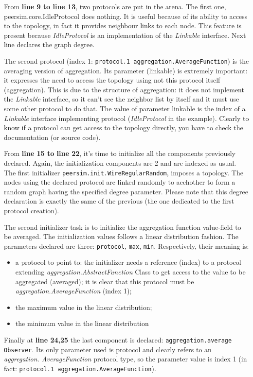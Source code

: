 \documentclass[a4paper,11pt]{article}
\begin{document}
From \textbf{line 9 to line 13}, two protocols are put in the arena.
The first one, peersim.core.IdleProtocol does nothing. It is useful
because of its ability to access to the topology, in fact it provides
neighbour links to each node. This feature is present because \emph{IdleProtocol}
is an implementation of the \emph{Linkable} interface. Next line declares
the graph degree. 

The second protocol (index 1: \texttt{protocol.1 aggregation.AverageFunction})
is the averaging version of aggregation. Its parameter (linkable)
is extremely important: it expresses the need to access the topology
using not this protocol itself (aggregation). This is due to the structure
of aggregation: it does not implement the \emph{Linkable} interface,
so it can't see the neighbor list by itself and it must use some other
protocol to do that. The value of parameter linkable is the index
of a \emph{Linkable} interface implementing protocol (\emph{IdleProtocol}
in the example). Clearly to know if a protocol can get access to the
topology directly, you have to check the documentation (or source
code).

From \textbf{line 15 to line 22}, it's time to initialize all the
components previously declared. Again, the initialization components
are 2 and are indexed as usual. The first initializer 
\texttt{peersim.init.WireRegularRandom},
imposes a topology. The nodes using the declared protocol are linked
randomly to aechother to form a random graph having the specified
degree parameter. Please note that this degree declaration is exactly
the same of the previous (the one dedicated to the first protocol
creation). 

The second initializer task is to initialize the aggregation function
value-field to be averaged. The initialization values follows a linear
distribution fashion. The parameters declared are three: \texttt{protocol},
\texttt{max}, \texttt{min}. Respectively, their meaning is:

\begin{itemize}
\item a protocol to point to: the initializer needs a reference (index)
to a protocol extending \emph{aggregation.AbstractFunction} Class
to get access to the value to be aggregated (averaged); it is clear
that this protocol must be \emph{aggregation.AverageFunction} (index
1);
\item the maximum value in the linear distribution; 
\item the minimum value in the linear distribution 
\end{itemize}
Finally at \textbf{line 24,25} the last component is declared: 
\texttt{aggregation.average Observer}.
Its only parameter used is protocol and clearly refers to an \emph{aggregation.
AverageFunction} protocol type, so the parameter value is index 1
(in fact: \texttt{protocol.1 aggregation.AverageFunction}). 
\end{document}
